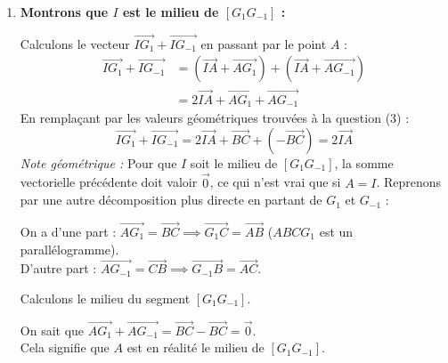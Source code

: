 \documentclass[12pt,a4paper]{article}
\newcommand{\redtitle}[1]{\textcolor{myred}{\textbf{#1}}}
\begin{document}
\begin{enumerate}
\begin{center}
\end{center}

    \item \redtitle{Montrons que $I$ est le milieu de $[G_1 G_{-1}]$ :}
    
    Calculons le vecteur $\overrightarrow{IG_1} + \overrightarrow{IG_{-1}}$ en passant par le point $A$ :
    \begin{align*}
        \overrightarrow{IG_1} + \overrightarrow{IG_{-1}} &= \left(\overrightarrow{IA} + \overrightarrow{AG_1}\right) + \left(\overrightarrow{IA} + \overrightarrow{AG_{-1}}\right) \\
        &= 2\overrightarrow{IA} + \overrightarrow{AG_1} + \overrightarrow{AG_{-1}}
    \end{align*}
    En remplaçant par les valeurs géométriques trouvées à la question (3) :
    \[ \overrightarrow{IG_1} + \overrightarrow{IG_{-1}} = 2\overrightarrow{IA} + \overrightarrow{BC} + (-\overrightarrow{BC}) = 2\overrightarrow{IA} \]
    \textit{Note géométrique :} Pour que $I$ soit le milieu de $[G_1G_{-1}]$, la somme vectorielle précédente doit valoir $\overrightarrow{0}$, ce qui n'est vrai que si $A=I$. Reprenons par une autre décomposition plus directe en partant de $G_1$ et $G_{-1}$ :
    
    On a d'une part : $\overrightarrow{AG_1} = \overrightarrow{BC} \implies \overrightarrow{G_1C} = \overrightarrow{AB}$ ($ABCG_1$ est un parallélogramme). \\
    D'autre part : $\overrightarrow{AG_{-1}} = \overrightarrow{CB} \implies \overrightarrow{G_{-1}B} = \overrightarrow{AC}$.
    
    Calculons le milieu du segment $[G_1G_{-1}]$. 
    
    On sait que $\overrightarrow{AG_1} + \overrightarrow{AG_{-1}} = \overrightarrow{BC} - \overrightarrow{BC} = \overrightarrow{0}$. \\
    Cela signifie que $A$ est en réalité le milieu de $[G_1 G_{-1}]$.
    

\end{enumerate}
\end{document}
